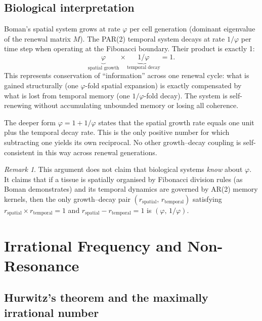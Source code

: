 \documentclass[11pt,letterpaper]{article}
\theoremstyle{definition}
\theoremstyle{remark}
\newtheorem{remark}{Remark}
\begin{document}
\subsection*{Biological interpretation}

Boman's spatial system grows at rate $\varphi$ per cell generation (dominant eigenvalue of the
renewal matrix $M$). The PAR(2) temporal system decays at rate $1/\varphi$ per time step when
operating at the Fibonacci boundary. Their product is exactly 1:
\[
\underbrace{\varphi}_{\text{spatial growth}} \times \underbrace{1/\varphi}_{\text{temporal decay}} = 1.
\]
This represents conservation of ``information'' across one renewal cycle: what is gained structurally
(one $\varphi$-fold spatial expansion) is exactly compensated by what is lost from temporal memory
(one $1/\varphi$-fold decay). The system is self-renewing without accumulating unbounded memory
or losing all coherence.

The deeper form $\varphi = 1 + 1/\varphi$ states that the spatial growth rate equals one unit
plus the temporal decay rate. This is the only positive number for which subtracting one yields
its own reciprocal. No other growth--decay coupling is self-consistent in this way across renewal
generations.

\begin{remark}
This argument does not claim that biological systems \emph{know} about $\varphi$. It claims that
if a tissue is spatially organised by Fibonacci division rules (as Boman demonstrates) and its
temporal dynamics are governed by AR(2) memory kernels, then the only growth--decay pair
$(r_{\text{spatial}},\, r_{\text{temporal}})$ satisfying
$r_{\text{spatial}} \times r_{\text{temporal}} = 1$ and
$r_{\text{spatial}} - r_{\text{temporal}} = 1$ is $(\varphi,\, 1/\varphi)$.
\end{remark}

\section{Irrational Frequency and Non-Resonance}
\label{sec:nonresonance}

\subsection{Hurwitz's theorem and the maximally irrational number}
\end{document}
